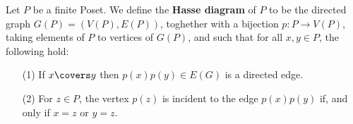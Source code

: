\begin{definition}
  Let $P$ be a finite Poset. We define the  \textbf{Hasse diagram} of
  $P$ to be the directed graph  $G(P)=(V(P),E(P))$, toghether with a
  bijection $p:P \xrightarrow{} V(P)$, taking elements of $P$ to
  vertices of  $G(P)$, and such that for all $x,y \in P$, the following
  hold:
  \begin{enumerate}
    \item[(1)] If $x \covers y$ then $p(x)p(y) \in E(G)$ is a directed
      edge.

    \item[(2)] For $z \in P$, the vertex $p(z)$ is incident to the
      edge $p(x)p(y)$ if, and only if $x=z$ or $y=z$.
  \end{enumerate}
\end{definition}

